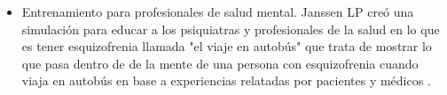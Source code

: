 \begin{itemize}
\item Entrenamiento para profesionales de salud mental. Janssen LP creó una simulación para educar a los psiquiatras y profesionales de la salud en lo que es tener esquizofrenia llamada "el viaje en autobús" que trata de mostrar lo que pasa dentro de de la mente de una persona con esquizofrenia cuando viaja en autobús en base a experiencias relatadas por pacientes y médicos \cite{mantovani:vr}.
\end{itemize}